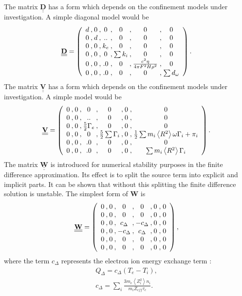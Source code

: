 The matrix $\underline{\underline{\mathbf{D}}}$ has a form which depends on the confinement
models under investigation. A simple diagonal model would be 
\[ 
 \underline{\underline{\mathbf{D}}} = \left( 
 \begin{array}{*{4}{c@{\:,\:}}c@{\;,\;}c}
  d & 0 & 0 &  0 & 0    & 0  \\
  0 & d & ..&  0 & 0    & 0  \\
  0 & 0 & k_e& 0 & 0    & 0  \\
  0 & 0 & 0 & \sum k_i& 0    & 0  \\
  0 & 0 & .0&  0 & \frac{c^2\eta}{4\pi F^{2} H\rho^{2}}   & 0  \\
  0 & 0 & .0&  0 & 0    & \sum d_\omega  \\
 \end{array} \right)    .
\]
The matrix $\underline{\underline{\mathbf{V}}}$ has a form which depends on the
confinement models under investigation. A simple  model would be 
\[ 
 \underline{\underline{\mathbf{V}}} = \left( 
 \begin{array}{*{4}{c@{\:,\:}}c@{\;,\;}c}
  0 & 0 & 0 &  0 & 0    & 0  \\
  0 & 0 & ..&  0 & 0    & 0  \\
  0 & 0 & \frac{5}{2}\Gamma_e& 0 & 0    & 0  \\
  0 & 0 & 0 &\frac{5}{2}\sum\Gamma_i & 0    & 
  \frac{1}{2}\sum m_{i} \left < R^2 \right > \omega\Gamma_i+ \pi_i \\
  0 & 0 & .0&  0 & 0  & 0  \\
  0 & 0 & .0&  0 & 0    & \sum m_i \left < R^2 \right > 
  \Gamma_i  \\
 \end{array} \right)  .      
\]
The matrix $ \underline{\underline{\mathbf{W}}} $ is introduced for numerical
stability purposes in the finite difference approximation. Its effect is to
split the source term into explicit and implicit parts. It can be shown that
without this splitting the finite difference solution is unstable. The simplest
form of $ \mathbf{W} $ is
\[ 
 \underline{\underline{\mathbf{W}}} = 
 \left( \begin{array}{*{4}{c@{\:,\:}}c@{\;,\;}c}
  0 & 0 & 0 &  0 & 0    & 0  \\
  0 & 0 & 0 &  0 & 0    & 0  \\
  0 & 0 & c_{\Delta}&- c_{\Delta} & 0    & 0  \\
  0 & 0 & -c_{\Delta}& c_{\Delta} & 0    & 0\\
  0 & 0 & 0&  0 & 0     & 0  \\
 0 & 0 & 0&  0 & 0     & 0  \\
 \end{array} \right)   ,     
\] 
where the term $c_{\Delta}  $ represents the electron
ion energy exchange term : \\
\begin{gather}
 Q_{\Delta} = c_{\Delta}\left ( T_e -T_i \right ), \\
 c_{\Delta} = \sum_i \frac{3 m_e \left < Z_{i}^2 \right > n_i}
 {m_i Z_{eff} \tau_e} .
\end{gather}


